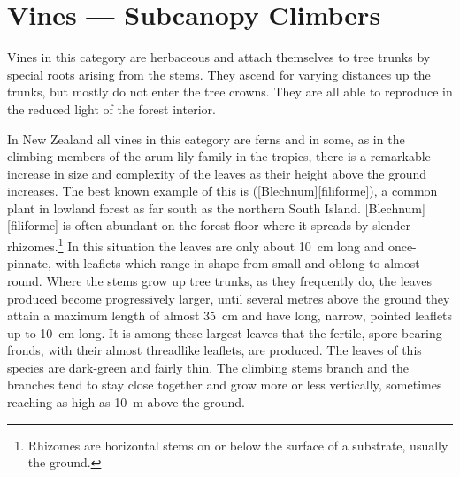 \section{Vines --- Subcanopy Climbers}

Vines in this category are herbaceous and attach themselves to tree trunks by special roots arising from the stems.
They ascend for varying distances up the trunks, but mostly do not enter the tree crowns.
They are all able to reproduce in the reduced light of the forest interior.

In New Zealand all vines in this category are ferns and in some, as in the climbing members of the arum lily family in the tropics, there is a remarkable increase in size and complexity of the leaves as their height above the ground increases.
The best known example of this is  ([Blechnum][filiforme]), a common plant in lowland forest as far south as the northern South Island. [Blechnum][filiforme] is often abundant on the forest floor where it spreads by slender rhizomes.\footnote{Rhizomes are horizontal stems on or below the surface of a substrate, usually the ground.}
In this situation the leaves are only about \SI{10}{\centi\metre} long and once-pinnate, with leaflets which range in shape from small and oblong to almost round.
Where the stems grow up tree trunks, as they frequently do, the leaves produced become progressively larger, until several metres above the ground they attain a maximum length of almost \SI{35}{\centi\metre} and have long, narrow, pointed leaflets up to \SI{10}{\centi\metre} long.
It is among these largest leaves that the fertile, spore-bearing fronds, with their almost threadlike leaflets, are produced.
The leaves of this species are dark-green and fairly thin.
The climbing stems branch and the branches tend to stay close together and grow more or less vertically, sometimes reaching as high as \SI{10}{\metre} above the ground.

